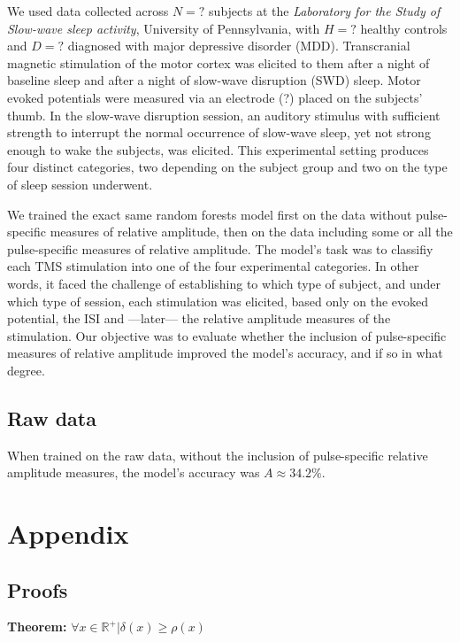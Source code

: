 \documentclass{article}
\begin{document}
\begin{multicols}{2}
We used data collected across $N = ?$ subjects at the
\textit{Laboratory for the Study of Slow-wave sleep activity},
University of Pennsylvania, with $H = ?$ healthy controls
and $D = ?$ diagnosed with major depressive disorder (MDD).
Transcranial magnetic stimulation of the motor cortex was
elicited to them after a night of baseline sleep and after a
night of slow-wave disruption (SWD) sleep. Motor evoked
potentials were measured via an electrode (?) placed on the
subjects' thumb. In the slow-wave disruption session, an
auditory stimulus with sufficient strength to interrupt the
normal occurrence of slow-wave sleep, yet not strong enough
to wake the subjects, was elicited. This experimental
setting produces four distinct categories, two depending on
the subject group and two on the type of sleep session
underwent.

We trained the exact same random forests model first on the
data without pulse-specific measures of relative amplitude,
then on the data including some or all the pulse-specific
measures of relative amplitude. The model's task was to
classifiy each TMS stimulation into one of the four
experimental categories. In other words, it faced the
challenge of establishing to which type of subject, and
under which type of session, each stimulation was elicited,
based only on the evoked potential, the ISI and ---later---
the relative amplitude measures of the stimulation. Our
objective was to evaluate whether the inclusion of
pulse-specific measures of relative amplitude improved the
model's accuracy, and if so in what degree. 


\subsection{Raw data}

When trained on the raw data, without the inclusion of
pulse-specific relative amplitude measures, the model's
accuracy was $A\approx34.2 \%$.

\pagebreak
\section{Appendix}

\subsection*{Proofs}

\textbf{Theorem: } $\forall x \in \mathbb{R}^+|\delta(x)
\geq \rho(x)$


\end{multicols}
\end{document}
